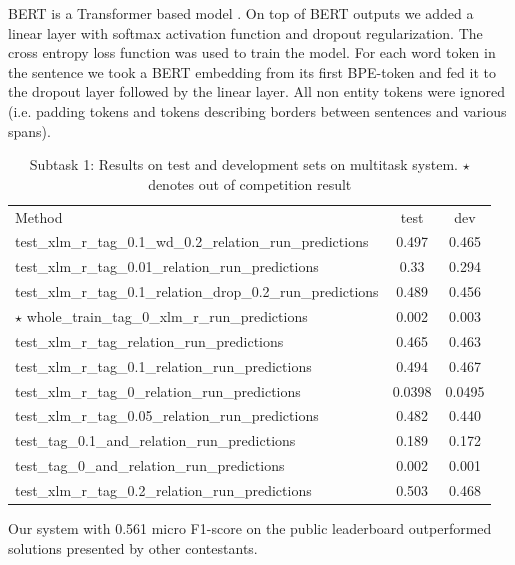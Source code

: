 \documentclass{dialogue}
\begin{document}
	BERT is a Transformer based model \cite{attention}. On top of BERT outputs we added a linear layer with softmax activation function and dropout regularization. The cross entropy loss function was used to train the model. For each word token in the sentence we took a BERT embedding from its first BPE-token and fed it to the dropout layer followed by the linear layer. All non entity tokens were ignored (i.e. padding tokens and tokens describing borders between sentences and various spans).
	
	\begin{table}[t!bh]
		\centering
		\scriptsize
		\begin{tabular}{lcc}%

			Method & test & dev \\

			test\_xlm\_r\_tag\_0.1\_wd\_0.2\_relation\_run\_predictions & 0.497 & 0.465 \\
			test\_xlm\_r\_tag\_0.01\_relation\_run\_predictions & 0.33 & 0.294 \\
			test\_xlm\_r\_tag\_0.1\_relation\_drop\_0.2\_run\_predictions & 0.489 & 0.456 \\
			$\star$ whole\_train\_tag\_0\_xlm\_r\_run\_predictions & 0.002 & 0.003 \\
			test\_xlm\_r\_tag\_relation\_run\_predictions & 0.465 & 0.463 \\
			test\_xlm\_r\_tag\_0.1\_relation\_run\_predictions & 0.494 & 0.467 \\
			test\_xlm\_r\_tag\_0\_relation\_run\_predictions & 0.0398 & 0.0495 \\
			test\_xlm\_r\_tag\_0.05\_relation\_run\_predictions & 0.482 & 0.440 \\
			test\_tag\_0.1\_and\_relation\_run\_predictions & 0.189 & 0.172 \\
			test\_tag\_0\_and\_relation\_run\_predictions & 0.002 & 0.001 \\
			test\_xlm\_r\_tag\_0.2\_relation\_run\_predictions & 0.503 & 0.468 \\

		\end{tabular}
		\caption{Subtask 1: Results on test and development sets on multitask system. $\star$ denotes out of competition result}
		\label{table:test_results}
	\end{table}
	
	Our system with 0.561 micro F1-score on the public leaderboard outperformed solutions presented by other contestants.
	
\end{document}
